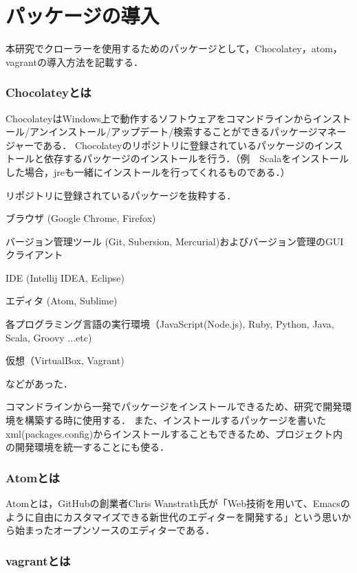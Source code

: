 \section{パッケージの導入}
本研究でクローラーを使用するためのパッケージとして，Chocolatey，atom，vagrantの導入方法を記載する．

\subsubsection*{Chocolateyとは}
ChocolateyはWindows上で動作するソフトウェアをコマンドラインからインストール/アンインストール/アップデート/検索することができるパッケージマネージャーである．
Chocolateyのリポジトリに登録されているパッケージのインストールと依存するパッケージのインストールを行う．（例　Scalaをインストールした場合，jreも一緒にインストールを行ってくれるものである．）

リポジトリに登録されているパッケージを抜粋する．

ブラウザ (Google Chrome, Firefox)

バージョン管理ツール (Git, Subersion, Mercurial)およびバージョン管理のGUIクライアント

IDE (Intellij IDEA, Eclipse)

エディタ (Atom, Sublime)

各プログラミング言語の実行環境（JavaScript(Node.js), Ruby, Python, Java, Scala, Groovy ...etc)

仮想（VirtualBox, Vagrant)

などがあった．

コマンドラインから一発でパッケージをインストールできるため、研究で開発環境を構築する時に使用する．
また、インストールするパッケージを書いたxml(packages.config)からインストールすることもできるため、プロジェクト内の開発環境を統一することにも使る．


\subsubsection*{Atomとは}
Atomとは，GitHubの創業者Chris Wanstrath氏が「Web技術を用いて、Emacsのように自由にカスタマイズできる新世代のエディターを開発する」という思いから始まったオープンソースのエディターである．\cite{atom}

\subsubsection*{vagrantとは}


